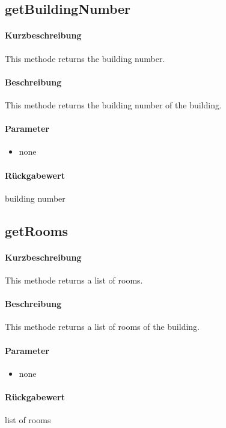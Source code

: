 \subsection{getBuildingNumber}%
\paragraph*{Kurzbeschreibung}
This methode returns the building number.
\paragraph*{Beschreibung}
This methode returns the building number of the building.
\paragraph*{Parameter}
\begin{itemize}
    \item none
\end{itemize}
\paragraph*{Rückgabewert}
building number

\subsection{getRooms}%
\paragraph*{Kurzbeschreibung}
This methode returns a list of rooms.
\paragraph*{Beschreibung}
This methode returns a list of rooms of the building.
\paragraph*{Parameter}
\begin{itemize}
    \item none
\end{itemize}
\paragraph*{Rückgabewert}
list of rooms
